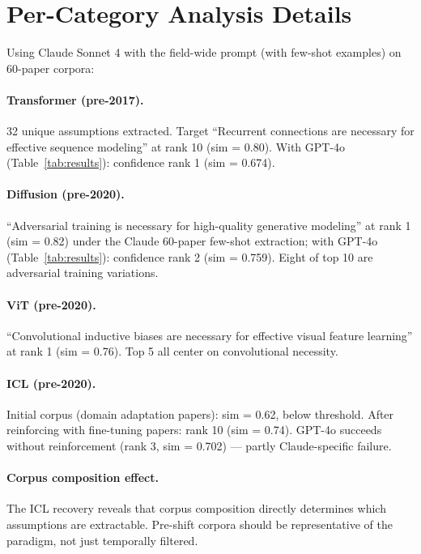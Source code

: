 \documentclass[11pt]{article}
\begin{document}
\section{Per-Category Analysis Details}\label{app:percategory}

Using Claude Sonnet 4 with the field-wide prompt (with few-shot examples) on 60-paper corpora:

\paragraph{Transformer (pre-2017).} 32 unique assumptions extracted. Target ``Recurrent connections are necessary for effective sequence modeling'' at rank 10 (sim = 0.80). With GPT-4o (Table~\ref{tab:results}): confidence rank 1 (sim = 0.674).

\paragraph{Diffusion (pre-2020).} ``Adversarial training is necessary for high-quality generative modeling'' at rank 1 (sim = 0.82) under the Claude 60-paper few-shot extraction; with GPT-4o (Table~\ref{tab:results}): confidence rank 2 (sim = 0.759). Eight of top 10 are adversarial training variations.

\paragraph{ViT (pre-2020).} ``Convolutional inductive biases are necessary for effective visual feature learning'' at rank 1 (sim = 0.76). Top 5 all center on convolutional necessity.

\paragraph{ICL (pre-2020).} Initial corpus (domain adaptation papers): sim = 0.62, below threshold. After reinforcing with fine-tuning papers: rank 10 (sim = 0.74). GPT-4o succeeds without reinforcement (rank 3, sim = 0.702) --- partly Claude-specific failure.

\paragraph{Corpus composition effect.} The ICL recovery reveals that corpus composition directly determines which assumptions are extractable. Pre-shift corpora should be representative of the paradigm, not just temporally filtered.
\end{document}
